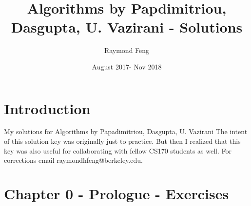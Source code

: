 \documentclass{article}
\title{Algorithms by Papdimitriou, Dasgupta, U. Vazirani - Solutions}
\author{Raymond Feng}
\date{August 2017- Nov 2018}
\begin{document}
\maketitle

\setcounter{section}{-2}
\section{Introduction}
My solutions for Algorithms by Papadimitriou, Dasgupta, U. Vazirani
The intent of this solution key was originally just to practice. But then I realized that this key was also useful for collaborating with fellow CS170 students as well. For corrections email raymondhfeng@berkeley.edu.

\setcounter{section}{-1}
\section{Chapter 0 - Prologue - Exercises}
\end{document}
